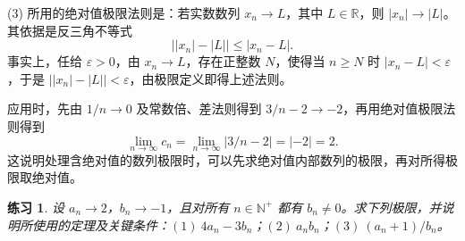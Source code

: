 \documentclass[UTF8,fontset=fandol,11pt]{ctexart}
\newtheorem{exercise}[definition]{练习}
\begin{document}
(3) 所用的绝对值极限法则是：若实数数列 $x_n\to L$，其中 $L\in\mathbb{R}$，则 $|x_n|\to|L|$。其依据是反三角不等式
\[
\bigl||x_n|-|L|\bigr|\leq|x_n-L|.
\]
事实上，任给 $\varepsilon>0$，由 $x_n\to L$，存在正整数 $N$，使得当 $n\geq N$ 时 $|x_n-L|<\varepsilon$，于是 $\bigl||x_n|-|L|\bigr|<\varepsilon$，由极限定义即得上述法则。

应用时，先由 $1/n\to0$ 及常数倍、差法则得到 $3/n-2\to-2$，再用绝对值极限法则得到
\[
\lim_{n\to\infty}c_n=\lim_{n\to\infty}|3/n-2|=|-2|=2.
\]
这说明处理含绝对值的数列极限时，可以先求绝对值内部数列的极限，再对所得极限取绝对值。\par
\begin{exercise}
\label{mathagent:exercise:8760977b7c41a7ab2d82304ea81f33749e9976ddafc1f87583b542c4b8793254}
设 $a_n\to2$，$b_n\to-1$，且对所有 $n\in\mathbb{N}^{+}$ 都有 $b_n\neq0$。求下列极限，并说明所使用的定理及关键条件：$(1)\ 4a_n-3b_n$；$(2)\ a_nb_n$；$(3)\ (a_n+1)/b_n$。
\end{exercise}
\end{document}
